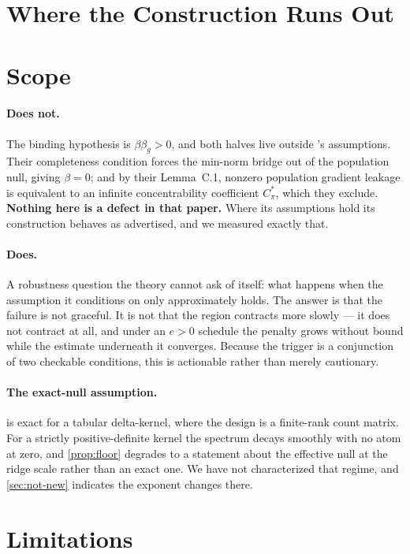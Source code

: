 \documentclass{article}
\theoremstyle{plain}
\theoremstyle{definition}
\begin{document}
\section{Where the Construction Runs Out}
\label{sec:exhaust}

\section{Scope}
\label{sec:scope}

\paragraph{Does not.} The binding hypothesis is $\beta\beta_g > 0$, and both
halves live outside \citet{hong2024}'s assumptions. Their completeness condition
forces the min-norm bridge out of the population null, giving $\beta = 0$; and by
their Lemma~C.1, nonzero population gradient leakage is equivalent to an infinite
concentrability coefficient $C^*_\pi$, which they exclude. \textbf{Nothing here
is a defect in that paper.} Where its assumptions hold its construction behaves
as advertised, and we measured exactly that.

\paragraph{Does.} A robustness question the theory cannot ask of itself: what
happens when the assumption it conditions on only approximately holds. The answer
is that the failure is not graceful. It is not that the region contracts more
slowly --- it does not contract at all, and under an $e>0$ schedule the penalty
grows without bound while the estimate underneath it converges. Because the
trigger is a conjunction of two checkable conditions, this is actionable rather
than merely cautionary.

\paragraph{The exact-null assumption.}  is exact for a tabular
delta-kernel, where the design is a finite-rank count matrix. For a strictly
positive-definite kernel the spectrum decays smoothly with no atom at zero, and
\cref{prop:floor} degrades to a statement about the effective null at the ridge
scale rather than an exact one. We have not characterized that regime, and
\cref{sec:not-new} indicates the exponent changes there.

\section{Limitations}
\label{sec:limits}
\end{document}
